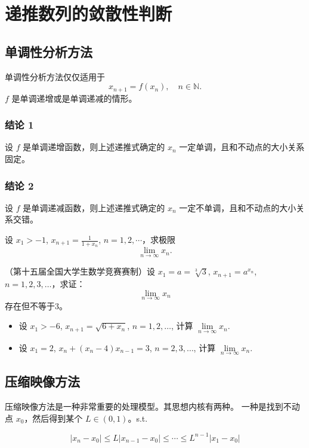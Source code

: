 \documentclass[lang=cn,10pt,thmcnt=section]{elegantbook}
\begin{document}
\section{递推数列的敛散性判断}
\subsection{单调性分析方法}
单调性分析方法仅仅适用于
\[
x_{n+1} = f(x_n), \quad n \in \mathbb{N}.
\]
$f$ 是单调递增或是单调递减的情形。

\subsubsection*{结论 1}
设 $f$ 是单调递增函数，则上述递推式确定的 $x_n$ 一定单调，且和不动点的大小关系固定。



\subsubsection*{结论 2}
设 $f$ 是单调递减函数，则上述递推式确定的 $x_n$ 一定不单调，且和不动点的大小关系交错。

\begin{example}
	设 $x_1 > -1$, $x_{n+1} = \frac{1}{1+x_n}$, $n = 1, 2, \cdots$，求极限
\[
\lim_{n \to \infty} x_n.
\]
\end{example}
\begin{example}
	（第十五届全国大学生数学竞赛赛制）设 $x_1 = a = \sqrt[3]{3}$, $x_{n+1} = a^{x_n}$, $n = 1, 2, 3, \ldots$，求证：
\[
\lim_{n \to \infty} x_n
\]
存在但不等于3。
\end{example}
\begin{example}
	\begin{itemize}
		\item 设 $x_1 > -6$, $x_{n+1} = \sqrt{6 + x_n}$, $n = 1, 2, \ldots$, 计算 $\lim\limits_{n \to \infty} x_n$.
		
		\item 设 $x_1 = 2$, $x_n + (x_n - 4)x_{n-1} = 3$, $n = 2, 3, \ldots$, 计算 $\lim\limits_{n \to \infty} x_n$.
	\end{itemize}
\end{example}
\subsection{压缩映像方法}
压缩映像方法是一种非常重要的处理模型。其思想内核有两种。
一种是找到不动点 \( x_0 \)，然后得到某个 \( L \in (0,1) \)。s.t.

\[|x_n - x_0| \leq L |x_{n-1} - x_0| \leq \cdots \leq L^{n-1} |x_1 - x_0|\]
\end{document}
